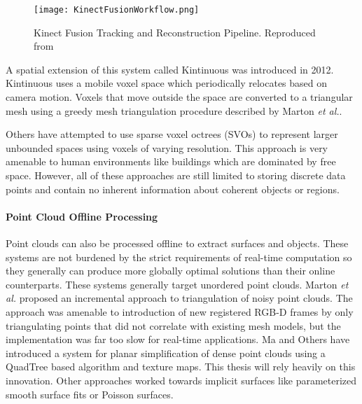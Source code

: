 \begin{figure}[!htpb]
    \centering
    \texttt{[image: KinectFusionWorkflow.png]}
    \caption{Kinect Fusion Tracking and Reconstruction Pipeline. Reproduced from\cite{izadi2011kinectfusion}}
    \label{fig:kinfu_workflow}
\end{figure}

A spatial extension of this system called Kintinuous was introduced in 2012\cite{whelan2012kintinuous,whelan:odometry}. Kintinuous uses a mobile voxel space which periodically relocates based on camera motion. Voxels that move outside the space are converted to a triangular mesh using a greedy mesh triangulation procedure described by Marton \textit{et al.}\cite{marton:fastreconstruction}.\par
Others have attempted to use sparse voxel octrees (SVOs) to represent larger unbounded spaces using voxels of varying resolution\cite{laine:svo,fastvoxelmaps}. This approach is very amenable to human environments like buildings which are dominated by free space. However, all of these approaches are still limited to storing discrete data points and contain no inherent information about coherent objects or regions.
\paragraph{Point Cloud Offline Processing}
Point clouds can also be processed offline to extract surfaces and objects. These systems are not burdened by the strict requirements of real-time computation so they generally can produce more globally optimal solutions than their online counterparts. These systems generally target unordered point clouds. Marton \textit{et al.} proposed an incremental approach to triangulation of noisy point clouds\cite{marton:fastreconstruction}. The approach was amenable to introduction of new registered RGB-D frames by only triangulating points that did not correlate with existing mesh models, but the implementation was far too slow for real-time applications. Ma and Others have introduced a system for planar simplification of dense point clouds using a QuadTree based algorithm\cite{ma2013planar,planesegmentationQTB} and texture maps. This thesis will rely heavily on this innovation. Other approaches worked towards implicit surfaces like parameterized smooth surface fits \cite{hormann2003scattered} or Poisson surfaces\cite{kazhdan2006poisson,bolitho2009parallel}.
